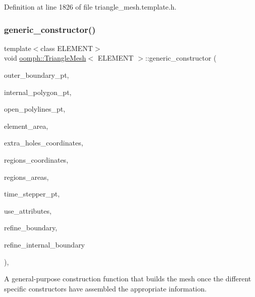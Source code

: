 Definition at line 1826 of file triangle\+\_\+mesh.\+template.\+h.

\mbox{\label{classoomph_1_1TriangleMesh_a2cdd830462582e6e004dee54ce8f1e2c}} 
\subsubsection{\texorpdfstring{generic\+\_\+constructor()}{generic\_constructor()}}
{\footnotesize\ttfamily template$<$class E\+L\+E\+M\+E\+NT$>$ \\
void \hyperlink{classoomph_1_1TriangleMesh}{oomph\+::\+Triangle\+Mesh}$<$ E\+L\+E\+M\+E\+NT $>$\+::generic\+\_\+constructor (\begin{DoxyParamCaption}\item[{Vector$<$ Triangle\+Mesh\+Polygon $\ast$$>$ \&}]{outer\+\_\+boundary\+\_\+pt,  }\item[{Vector$<$ Triangle\+Mesh\+Polygon $\ast$$>$ \&}]{internal\+\_\+polygon\+\_\+pt,  }\item[{Vector$<$ Triangle\+Mesh\+Open\+Curve $\ast$$>$ \&}]{open\+\_\+polylines\+\_\+pt,  }\item[{const double \&}]{element\+\_\+area,  }\item[{Vector$<$ Vector$<$ double $>$ $>$ \&}]{extra\+\_\+holes\+\_\+coordinates,  }\item[{std\+::map$<$ unsigned, Vector$<$ double $>$ $>$ \&}]{regions\+\_\+coordinates,  }\item[{std\+::map$<$ unsigned, double $>$ \&}]{regions\+\_\+areas,  }\item[{Time\+Stepper $\ast$}]{time\+\_\+stepper\+\_\+pt,  }\item[{const bool \&}]{use\+\_\+attributes,  }\item[{const bool \&}]{refine\+\_\+boundary,  }\item[{const bool \&}]{refine\+\_\+internal\+\_\+boundary }\end{DoxyParamCaption})\hspace{0.3cm}{\ttfamily [inline]}, {\ttfamily [protected]}}



A general-\/purpose construction function that builds the mesh once the different specific constructors have assembled the appropriate information. 



